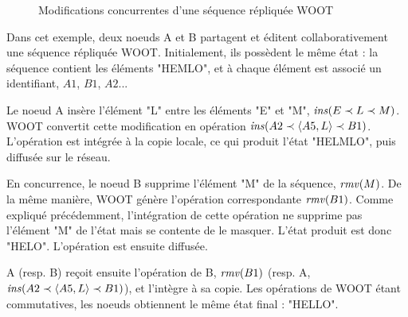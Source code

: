 \begin{figure}[!ht]
{
  }
  \caption{Modifications concurrentes d'une séquence répliquée WOOT}
  \label{fig:woot}
\end{figure}

Dans cet exemple, deux noeuds A et B partagent et éditent collaborativement une séquence répliquée WOOT.
Initialement, ils possèdent le même état : la séquence contient les éléments "HEMLO", et à chaque élément est associé un identifiant, \eg $A1$, $B1$, $A2$...

Le noeud A insère l'élément "L" entre les éléments "E" et "M", \ie $\mathit{ins}(E \prec L \prec M)$.
WOOT convertit cette modification en opération $\mathit{ins}(A2 \prec \langle A5,L \rangle \prec B1)$.
L'opération est intégrée à la copie locale, ce qui produit l'état "HELMLO", puis diffusée sur le réseau.

En concurrence, le noeud B supprime l'élément "M" de la séquence, \ie $\mathit{rmv}(M)$.
De la même manière, WOOT génère l'opération correspondante $\mathit{rmv}(B1)$.
Comme expliqué précédemment, l'intégration de cette opération ne supprime pas l'élément "M" de l'état mais se contente de le masquer.
L'état produit est donc "HELO".
L'opération est ensuite diffusée.

A (resp. B) reçoit ensuite l'opération de B, $\mathit{rmv}(B1)$ (resp. A, $\mathit{ins}(A2 \prec \langle A5,L \rangle \prec B1)$), et l'intègre à sa copie.
Les opérations de WOOT étant commutatives, les noeuds obtiennent le même état final : "HELLO".

